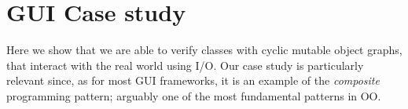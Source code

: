 \SS\section{GUI Case study}
\label{s:case-study}


%
%
%
%
%
%
%
Here we show that we are able to verify classes with cyclic mutable object graphs, that interact with the real world using I/O.
Our case study is particularly relevant since, as for most GUI frameworks,
it is an example of the \emph{composite} programming pattern; arguably one of the most fundamental patterns in OO.

